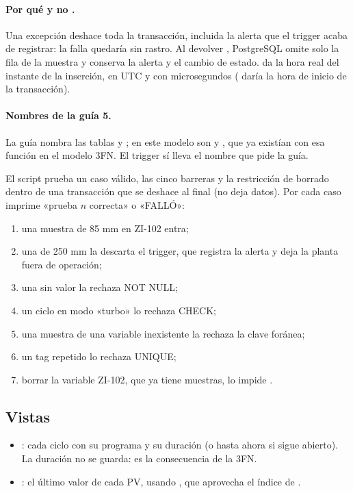 \documentclass[a4paper,11pt]{article}
\begin{document}
\paragraph{Por qué  y no .} Una excepción deshace toda la transacción, incluida la alerta que el trigger acaba de registrar: la falla quedaría sin rastro. Al devolver , PostgreSQL omite solo la fila de la muestra y conserva la alerta y el cambio de estado.  da la hora real del instante de la inserción, en UTC y con microsegundos ( daría la hora de inicio de la transacción).

\paragraph{Nombres de la guía 5.} La guía nombra las tablas  y ; en este modelo son  y , que ya existían con esa función en el modelo 3FN. El trigger sí lleva el nombre que pide la guía.

El script  prueba un caso válido, las cinco barreras y la restricción de borrado dentro de una transacción que se deshace al final (no deja datos). Por cada caso imprime «prueba $n$ correcta» o «FALLÓ»:
\begin{enumerate}
\item una muestra de 85 mm en ZI-102 entra;
\item una de 250 mm la descarta el trigger, que registra la alerta y deja la planta fuera de operación;
\item una sin valor la rechaza NOT NULL;
\item un ciclo en modo «turbo» lo rechaza CHECK;
\item una muestra de una variable inexistente la rechaza la clave foránea;
\item un tag repetido lo rechaza UNIQUE;
\item borrar la variable ZI-102, que ya tiene muestras, lo impide .
\end{enumerate}

\subsection*{Vistas}
\begin{itemize}
\item {}: cada ciclo con su programa y su duración  (o hasta ahora si sigue abierto). La duración no se guarda: es la consecuencia de la 3FN.
\item {}: el último valor de cada PV, usando , que aprovecha el índice de .
\end{itemize}
\end{document}
